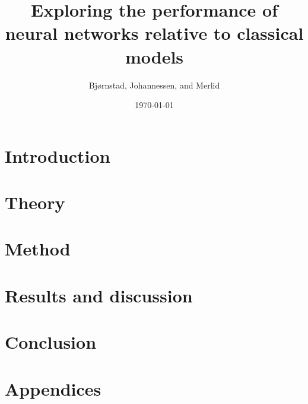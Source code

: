 \documentclass[aps,rmp,reprint,amsmath,amssymb,twocolumn,floatfix]{revtex4-1}
\begin{document}
\title{Exploring the performance of neural networks relative to classical models}

\author{Bjørnstad, Johannessen, and Merlid}
\date{\today}


\begin{abstract}

\end{abstract}
\maketitle

\tableofcontents

\section{Introduction}
\label{sec:introduction}

\section{Theory}


\section{Method}


\section{Results and discussion}


%

\section{Conclusion}


\newpage
{} %

\clearpage
\appendix
\section{Appendices}
\label{appendix}

\end{document}
